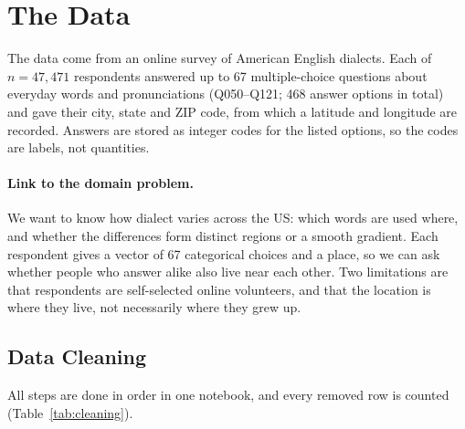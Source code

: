 \documentclass[10pt,letterpaper]{article}
\begin{document}
\section{The Data}\label{data}

The data come from an online survey of American English dialects. Each of $n = 47{,}471$ respondents answered up to 67 multiple-choice questions about everyday words and pronunciations (Q050--Q121; 468 answer options in total) and gave their city, state and ZIP code, from which a latitude and longitude are recorded. Answers are stored as integer codes for the listed options, so the codes are labels, not quantities.

\paragraph{Link to the domain problem.} We want to know how dialect varies across the US: which words are used where, and whether the differences form distinct regions or a smooth gradient. Each respondent gives a vector of 67 categorical choices and a place, so we can ask whether people who answer alike also live near each other. Two limitations are that respondents are self-selected online volunteers, and that the location is where they live, not necessarily where they grew up.

\subsection{Data Cleaning}\label{data-cleaning}

All steps are done in order in one notebook, and every removed row is counted (Table~\ref{tab:cleaning}).
\end{document}
